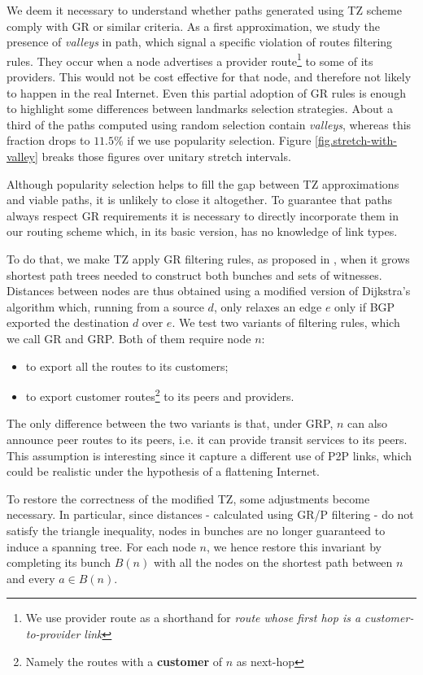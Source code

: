 \documentclass[a4paper,11pt,oneside]{report}
\begin{document}
\bigskip
We deem it necessary to understand whether paths generated using TZ scheme comply with GR or similar criteria. 
As a first approximation, we study the presence of \emph{valleys} in path, which signal a specific violation of routes filtering rules. They occur when a node advertises a provider route\footnote{We use provider route as a shorthand for \textit{route whose first hop is a customer-to-provider link}} to some of its providers. This would not be cost effective for that node, and therefore not likely to happen in the real Internet. Even this partial adoption of GR rules is enough to highlight some differences between landmarks selection strategies.
About a third of the paths computed using random selection contain \textit{valleys}, whereas this fraction drops to $11.5\%$ if we use popularity selection. Figure \ref{fig.stretch-with-valley} breaks those figures over unitary stretch intervals. 

\bigskip
Although popularity selection helps to fill the gap between TZ approximations and viable paths, it is unlikely to close it altogether. To guarantee that paths always respect GR requirements it is necessary to directly incorporate them in our routing scheme which, in its basic version, has no knowledge of link types. 

\bigskip
To do that, we make TZ apply GR filtering rules, as proposed in \cite{lixingaoStableInternetRouting2001}, when it grows shortest path trees needed to construct both bunches and sets of witnesses.
Distances between nodes are thus obtained using a modified version of Dijkstra's algorithm which, running from a source $d$, only relaxes an edge $e$ only if BGP exported the destination $d$ over $e$. We test two variants of filtering rules, which we call GR and GRP. Both of them require node $n$:
\begin{itemize}
\item to export all the routes to its customers;
\item to export customer routes\footnote{Namely the routes with a \textbf{customer} of $n$ as next-hop} to its peers and providers.
\end{itemize}
The only difference between the two variants is that, under GRP, $n$ can also announce peer routes to its peers, i.e. it can provide transit services to its peers. This assumption is interesting since it capture a different use of P2P links, which could be realistic under the hypothesis of a flattening Internet.

\bigskip
To restore the correctness of the modified TZ, some adjustments become necessary. In particular, since distances - calculated using GR/P filtering - do not satisfy the triangle inequality, nodes in bunches are no longer guaranteed to induce a spanning tree. For each node $n$, we hence restore this invariant by completing its bunch $B(n)$ with all the nodes on the shortest path between $n$ and every $a \in B(n)$.
\end{document}
